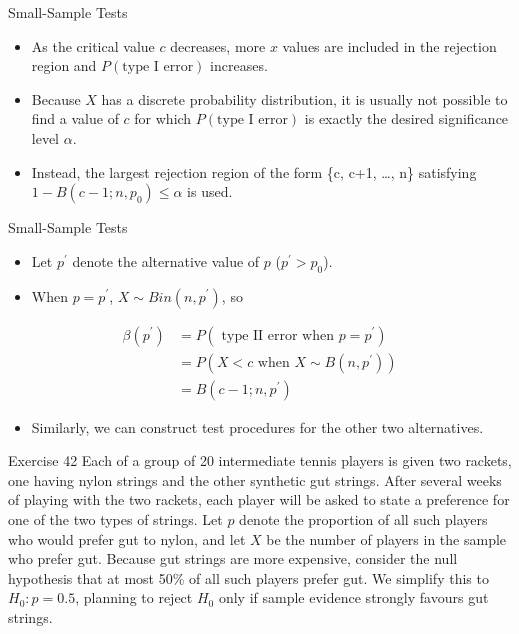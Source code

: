 \documentclass[
  ignorenonframetext,
]{beamer}
\providecommand{\tightlist}{%
  \setlength{\itemsep}{0pt}\setlength{\parskip}{0pt}}\usepackage{longtable,booktabs,array}
\begin{document}
\begin{frame}{Small-Sample Tests}
\protect\hypertarget{small-sample-tests-1}{}
\begin{itemize}[<+->]
\tightlist
\item
  As the critical value \(c\) decreases, more \(x\) values are included
  in the rejection region and \(P(\text{type I error})\) increases.
\item
  Because \(X\) has a discrete probability distribution, it is usually
  not possible to find a value of \(c\) for which
  \(P(\text{type I error})\) is exactly the desired significance level
  \(\alpha\).
\item
  Instead, the largest rejection region of the form \{c, c+1, \ldots,
  n\} satisfying \(1 - B(c-1;n,p_{0}) \leq \alpha\) is used.
\end{itemize}
\end{frame}

\begin{frame}{Small-Sample Tests}
\protect\hypertarget{small-sample-tests-2}{}
\begin{itemize}[<+->]
\tightlist
\item
  Let \(p^{\prime}\) denote the alternative value of \(p\)
  (\(p^{\prime} > p_{0}\)).
\item
  When \(p = p^{\prime}\), \(X \sim Bin(n,p^{\prime})\), so
\end{itemize}

\[
\begin{aligned}
\beta(p^{\prime}) &= P(\text{ type II error when } p = p^{\prime}) \\
&= P(X < c \text{ when } X\sim B(n,p^{\prime})) \\
&= B(c-1;n,p^{\prime})
\end{aligned}
\]

\begin{itemize}[<+->]
\tightlist
\item
  Similarly, we can construct test procedures for the other two
  alternatives.
\end{itemize}
\end{frame}

\begin{frame}{Exercise 42}
\protect\hypertarget{exercise-42}{}
Each of a group of 20 intermediate tennis players is given two rackets,
one having nylon strings and the other synthetic gut strings. After
several weeks of playing with the two rackets, each player will be asked
to state a preference for one of the two types of strings. Let \(p\)
denote the proportion of all such players who would prefer gut to nylon,
and let \(X\) be the number of players in the sample who prefer gut.
Because gut strings are more expensive, consider the null hypothesis
that at most 50\% of all such players prefer gut. We simplify this to
\(H_{0}: p = 0.5\), planning to reject \(H_{0}\) only if sample evidence
strongly favours gut strings.
\end{frame}
\end{document}
